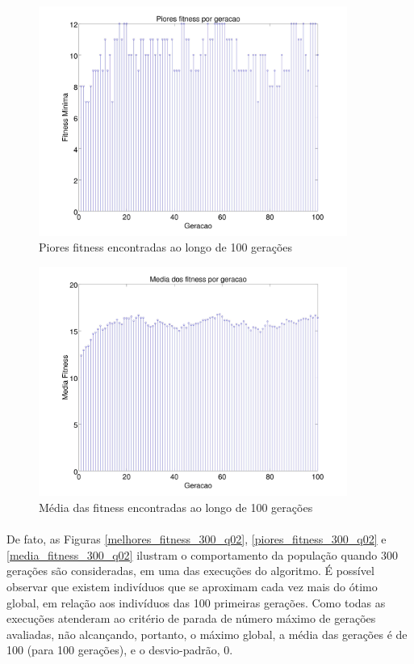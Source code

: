 \documentclass{report}
\begin{document}
	\begin{figure}[H]
		\centering
		\includegraphics[width = 0.9\textwidth]{Q02_piores_fitness_100.jpg}
		\caption{Piores fitness encontradas ao longo de 100 gerações}
		\label{piores_fitness_100_q02}
	\end{figure}
	
	\begin{figure}[H]
		\centering
		\includegraphics[width = 0.9\textwidth]{Q02_media_fitness_100.jpg}
		\caption{Média das fitness encontradas ao longo de 100 gerações}
		\label{media_fitness_100_q02}
	\end{figure}
	
	\paragraph{} De fato, as Figuras \ref{melhores_fitness_300_q02}, \ref{piores_fitness_300_q02} e \ref{media_fitness_300_q02} ilustram o comportamento da população quando 300 gerações são consideradas, em uma das execuções do algoritmo. É possível observar que existem indivíduos que se aproximam cada vez mais do ótimo global, em relação aos indivíduos das 100 primeiras gerações. Como todas as execuções atenderam ao critério de parada de número máximo de gerações avaliadas, não alcançando, portanto, o máximo global, a média das gerações é de 100 (para 100 gerações), e o desvio-padrão, 0.\\ 
	
\end{document}
